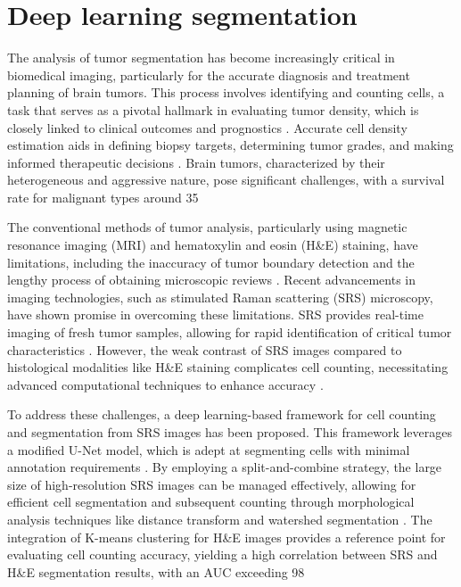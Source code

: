 \documentclass[runningheads]{llncs}
\begin{document}
\section{Deep learning segmentation}
The analysis of tumor segmentation has become increasingly critical in biomedical imaging, particularly for the accurate diagnosis and treatment planning of brain tumors. This process involves identifying and counting cells, a task that serves as a pivotal hallmark in evaluating tumor density, which is closely linked to clinical outcomes and prognostics \cite{Qianqian_2021}. Accurate cell density estimation aids in defining biopsy targets, determining tumor grades, and making informed therapeutic decisions \cite{Qianqian_2021}. Brain tumors, characterized by their heterogeneous and aggressive nature, pose significant challenges, with a survival rate for malignant types around 35%

The conventional methods of tumor analysis, particularly using magnetic resonance imaging (MRI) and hematoxylin and eosin (H&E) staining, have limitations, including the inaccuracy of tumor boundary detection and the lengthy process of obtaining microscopic reviews \cite{Qianqian_2021}. Recent advancements in imaging technologies, such as stimulated Raman scattering (SRS) microscopy, have shown promise in overcoming these limitations. SRS provides real-time imaging of fresh tumor samples, allowing for rapid identification of critical tumor characteristics \cite{Qianqian_2021}. However, the weak contrast of SRS images compared to histological modalities like H&E staining complicates cell counting, necessitating advanced computational techniques to enhance accuracy \cite{Qianqian_2021}.

To address these challenges, a deep learning-based framework for cell counting and segmentation from SRS images has been proposed. This framework leverages a modified U-Net model, which is adept at segmenting cells with minimal annotation requirements \cite{Qianqian_2021}. By employing a split-and-combine strategy, the large size of high-resolution SRS images can be managed effectively, allowing for efficient cell segmentation and subsequent counting through morphological analysis techniques like distance transform and watershed segmentation \cite{Qianqian_2021}. The integration of K-means clustering for H&E images provides a reference point for evaluating cell counting accuracy, yielding a high correlation between SRS and H&E segmentation results, with an AUC exceeding 98%
\end{document}
